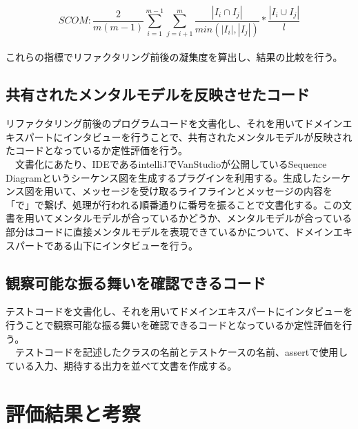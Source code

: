 \documentclass[12pt, a4paper]{jreport}
\begin{document}
\begin{equation}
SCOM:
\frac{2}{m(m-1)}\sum^{m-1}_{i=1}\sum^{m}_{j=i+1}\frac{|{I}_{i}\cap{I}_{j}|}{min(|{I}_{i}|,|{I}_{j}|)}*\frac{|{I}_{i}\cup{I}_{j}|}{l}
\end{equation}
\\これらの指標でリファクタリング前後の凝集度を算出し、結果の比較を行う。
\subsection{共有されたメンタルモデルを反映させたコード}
リファクタリング前後のプログラムコードを文書化し、それを用いてドメインエキスパートにインタビューを行うことで、共有されたメンタルモデルが反映されたコードとなっているか定性評価を行う。
\\　文書化にあたり、IDEであるintelliJでVanStudioが公開しているSequence Diagramというシーケンス図を生成するプラグインを利用する。生成したシーケンス図を用いて、メッセージを受け取るライフラインとメッセージの内容を「で」で繋げ、処理が行われる順番通りに番号を振ることで文書化する。この文書を用いてメンタルモデルが合っているかどうか、メンタルモデルが合っている部分はコードに直接メンタルモデルを表現できているかについて、ドメインエキスパートである山下にインタビューを行う。
\subsection{観察可能な振る舞いを確認できるコード}
テストコードを文書化し、それを用いてドメインエキスパートにインタビューを行うことで観察可能な振る舞いを確認できるコードとなっているか定性評価を行う。
\\　テストコードを記述したクラスの名前とテストケースの名前、assertで使用している入力、期待する出力を並べて文書を作成する。
\section{評価結果と考察}
\end{document}
